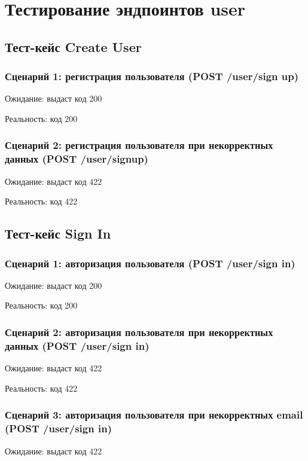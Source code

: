 \documentclass[a4paper,12pt]{article}
\begin{document}
\section*{Тестирование эндпоинтов user}

\subsection*{Тест-кейс Create User}

\subsubsection*{Сценарий 1: регистрация пользователя (POST /user/sign up)}
Ожидание: выдаст код 200

Реальность: код 200



\subsubsection*{Сценарий 2: регистрация пользователя при некорректных данных (POST /user/signup)}
Ожидание: выдаст код 422

Реальность: код 422



\subsection*{Тест-кейс Sign In}

\subsubsection*{Сценарий 1: авторизация пользователя (POST /user/sign in)}
Ожидание: выдаст код 200

Реальность: код 200



\subsubsection*{Сценарий 2: авторизация пользователя при некорректных данных (POST /user/sign in)}
Ожидание: выдаст код 422

Реальность: код 422



\subsubsection*{Сценарий 3: авторизация пользователя при некорректных email (POST /user/sign in)}
Ожидание: выдаст код 422
\end{document}
